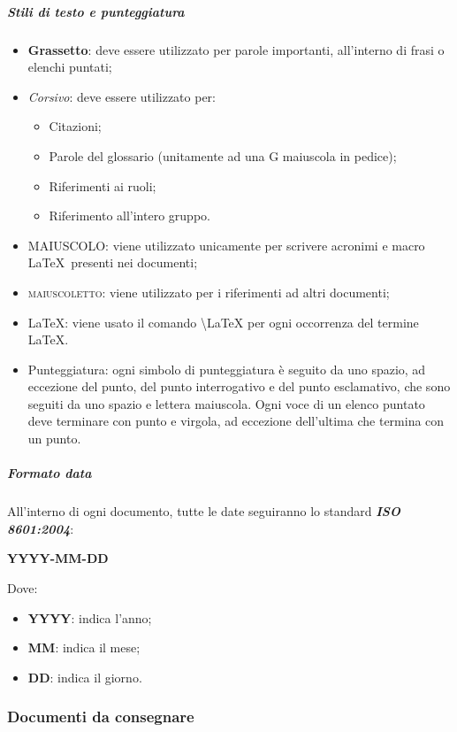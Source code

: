 				\subparagraph{Stili di testo e punteggiatura}
				\begin{itemize}
					\item \textbf{Grassetto}: deve essere utilizzato per parole importanti, all’interno di frasi o elenchi puntati;
					\item \textit{Corsivo}: deve essere utilizzato per:
					\begin{itemize}
						\item Citazioni;
						\item Parole del glossario (unitamente ad una G maiuscola in pedice);
						\item Riferimenti ai ruoli;
						\item Riferimento all'intero gruppo.
					\end{itemize}
					\item MAIUSCOLO: viene utilizzato unicamente per scrivere acronimi e macro \LaTeX\ presenti nei documenti;
					\item \textsc{maiuscoletto}: viene utilizzato per i riferimenti ad altri documenti;
					\item \LaTeX: viene usato il comando \textbackslash{LaTeX} per ogni occorrenza del termine \LaTeX.
					\item Punteggiatura: ogni simbolo di punteggiatura è seguito da uno spazio, ad eccezione del punto, del punto interrogativo e del punto esclamativo, che sono seguiti da uno spazio e lettera maiuscola. Ogni voce di un elenco puntato deve terminare con punto e virgola, ad eccezione dell'ultima che termina con un punto. 
					\end{itemize}
	
				\subparagraph{Formato data}
				All'interno di ogni documento, tutte le date seguiranno lo standard \textit{\textbf{ISO 8601:2004}}:
				\begin{center}
					\textbf{YYYY-MM-DD}
				\end{center}
				Dove:
				\begin{itemize}
					\item \textbf{YYYY}: indica l'anno;
					\item \textbf{MM}: indica il mese;
					\item \textbf{DD}: indica il giorno.
				\end{itemize}
		
		\subsubsection{Documenti da consegnare}
